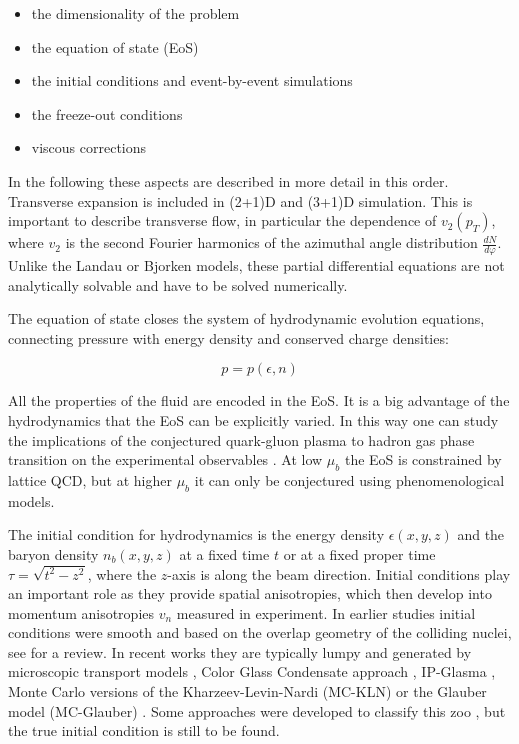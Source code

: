 \begin{itemize}
  \item the dimensionality of the problem
  \item the equation of state (EoS)
  \item the initial conditions and event-by-event simulations
  \item the freeze-out conditions
  \item viscous corrections
\end{itemize}

In the following these aspects are described in more detail in this order.
Transverse expansion is included in (2+1)D and (3+1)D simulation. This is
important to describe transverse flow, in particular the dependence of
 $v_2(p_T)$, where $v_2$ is the second Fourier harmonics of the azimuthal angle distribution
 $\frac{dN}{d\varphi}$. Unlike the Landau or Bjorken models, these
 partial differential equations are not analytically solvable and have to
 be solved numerically.

The equation of state closes the system of hydrodynamic evolution equations,
connecting pressure with energy density and conserved charge densities:

\begin{equation}
 p = p (\epsilon, n)
\end{equation}

All the properties of the fluid are encoded in the EoS.  It is a big advantage
of the hydrodynamics that the EoS can be explicitly varied.  In this way one
can study the implications of the conjectured quark-gluon plasma to hadron gas
phase transition on the experimental observables \cite{Pang:2016vdc}. At low
$\mu_b$ the EoS is constrained by lattice QCD, but at higher $\mu_b$ it can
only be conjectured using phenomenological models.

The initial condition for hydrodynamics is the energy density $\epsilon(x,y,z)$ and
the baryon density $n_b(x,y,z)$ at a fixed time $t$ or at a fixed proper time
$\tau = \sqrt{t^2 - z^2}$, where the $z$-axis is along the beam direction.  Initial
conditions play an important role as they provide spatial anisotropies, which then
develop into momentum anisotropies $v_n$ measured in experiment. In earlier studies
initial conditions were smooth and based on the overlap geometry of the colliding
nuclei, see \cite{Huovinen:2006jp} for a review. In recent works they are
typically lumpy and generated by microscopic transport models
\cite{Petersen:2008dd,Karpenko:2015xea,Pang:2012he}, Color Glass Condensate
approach \cite{Lappi:2006xc,Schenke:2012wb}, IP-Glasma \cite{Gale:2012rq},
Monte Carlo versions of the Kharzeev-Levin-Nardi (MC-KLN)
\cite{Albacete:2011fw,Drescher:2006ca} or the Glauber model (MC-Glauber)
\cite{Miller:2007ri,Broniowski:2007nz,Loizides:2014vua}. Some approaches were
developed to classify this zoo \cite{ColemanSmith:2012ka}, but the true
initial condition is still to be found.

